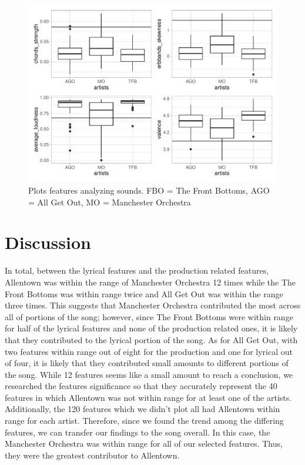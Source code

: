 \documentclass{article}\usepackage[]{graphicx}\usepackage[]{xcolor}
\begin{document}
\begin{multicols}{2}
     \begin{figure}[H]
    \begin{center}
       \includegraphics[scale=0.5]{sound2.pdf}
       \caption{Plots features analyzing sounds. FBO = The Front Bottoms, AGO = 
       All Get Out, MO = Manchester Orchestra}
     \label{sound2}
     \end{center}
   \end{figure}



\section{Discussion}
  In total, between the lyrical features and the production related features, Allentown was within the range of Manchester Orchestra 12 times while the The Front Bottoms was within range twice and All Get Out was within the range three times. This suggests that Manchester Orchestra contributed the most across all of portions of the song; however, since The Front Bottoms were within range for half of the lyrical features and none of the production related ones, it is likely that they contributed to the lyrical portion of the song. As for All Get Out, with two features within range out of eight for the production and one for lyrical out of four, it is likely that they contributed small amounts to different portions of the song.
  While 12 features seems like a small amount to reach  a conclusion, we researched the features significance so that they accurately represent the 40 features in which Allentown was not within range for at least one of the artists. Additionally, the 120 features which we didn't plot all had Allentown within range for each artist. Therefore, since we found the trend among the differing features, we can transfer our findings to the song overall. In this case, the Manchester Orchestra was within range for all of our selected features. Thus, they were the greatest contributor to Allentown.


\end{multicols}
\end{document}
